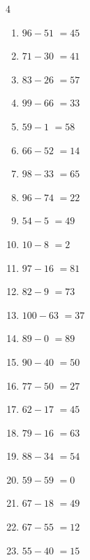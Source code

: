 \begin{multicols}{4}
\begin{enumerate}
  \item $96-51$
        $=45$

  \item $71-30$
        $=41$

  \item $83-26$
        $=57$

  \item $99-66$
        $=33$

  \item $59-1$
        $=58$

  \item $66-52$
        $=14$

  \item $98-33$
        $=65$

  \item $96-74$
        $=22$

  \item $54-5$
        $=49$

  \item $10-8$
        $=2$

  \item $97-16$
        $=81$

  \item $82-9$
        $=73$

  \item $100-63$
        $=37$

  \item $89-0$
        $=89$

  \item $90-40$
        $=50$

  \item $77-50$
        $=27$

  \item $62-17$
        $=45$

  \item $79-16$
        $=63$

  \item $88-34$
        $=54$

\columnbreak %

  \item $59-59$
        $=0$

  \item $67-18$
        $=49$

  \item $67-55$
        $=12$

  \item $55-40$
        $=15$


\end{enumerate}
\end{multicols}
